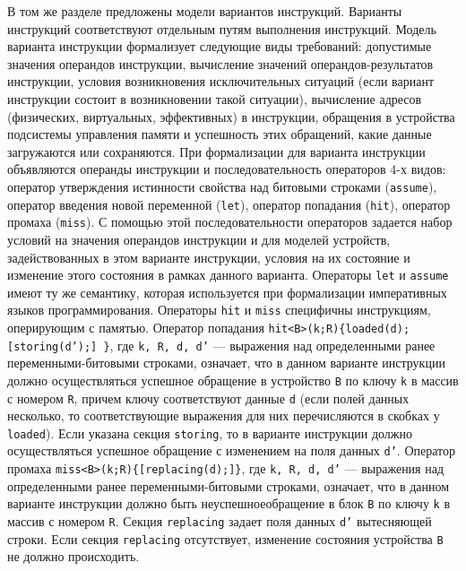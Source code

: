 \documentclass[14pt,autoref,href
,facsimile
]{disser}
\begin{document}
В том же разделе предложены модели вариантов инструкций. Варианты инструкций соответствуют отдельным путям выполнения инструкций. Модель варианта инструкции формализует следующие виды требований: допустимые значения операндов инструкции, вычисление значений операндов-результатов инструкции, условия возникновения исключительных ситуаций (если вариант инструкции состоит в возникновении такой ситуации), вычисление адресов (физических, виртуальных, эффективных) в инструкции, обращения в устройства подсистемы управления памяти и успешность этих обращений, какие данные загружаются или сохраняются. При формализации для варианта инструкции объявляются операнды инструкции и последовательность операторов 4-х видов: оператор утверждения истинности свойства над битовыми строками (\texttt{assume}), оператор введения новой переменной (\texttt{let}), оператор попадания (\texttt{hit}), оператор промаха (\texttt{miss}). С помощью этой последовательности операторов задается набор условий на значения операндов инструкции и для моделей устройств, задействованных в этом варианте инструкции, условия на их состояние и изменение этого состояния в рамках данного варианта. Операторы \texttt{let} и \texttt{assume} имеют ту же семантику, которая используется при формализации императивных языков программирования. Операторы \texttt{hit} и \texttt{miss} специфичны инструкциям, оперирующим с памятью. Оператор попадания \texttt{hit<B>(k;R)\{loaded(d); [storing(d');] \}}, где \texttt{k, R, d, d'} --- выражения над определенными ранее переменными-битовыми строками, означает, что в данном варианте инструкции должно осуществляться успешное обращение в устройство \texttt{B} по ключу \texttt{k} в массив с номером \texttt{R}, причем ключу соответствуют данные \texttt{d} (если полей данных несколько, то соответствующие выражения для них перечисляются в скобках у \texttt{loaded}). Если указана секция \texttt{storing}, то в варианте инструкции должно осуществляться успешное обращение с изменением на поля данных \texttt{d'}. Оператор промаха \texttt{miss<B>(k;R)\{[replacing(d);]\}}, где \texttt{k, R, d, d'} --- выражения над определенными ранее переменными-битовыми строками, означает, что в данном варианте инструкции должно быть неуспешноеобращение в блок \texttt{B} по ключу \texttt{k} в массив с номером \texttt{R}. Секция \texttt{replacing} задает поля данных \texttt{d'} вытесняющей строки. Если секция \texttt{replacing} отсутствует, изменение состояния устройства \texttt{B} не должно происходить.
\end{document}
